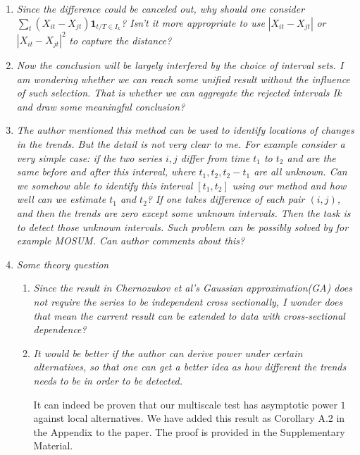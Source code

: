 \documentclass[a4paper,12pt]{article}
\begin{document}
\begin{enumerate}[label=(\arabic*),leftmargin=0.7cm]

\item \textit{Since the difference could be canceled out, why should one consider} $\sum\nolimits_t (X_{it} - X_{jt})\mathbf{1}_{t/T \in I_k}$\textit{? Isn't it more appropriate to use} $|X_{it} - X_{jt}|$ \textit{ or } $|X_{it} - X_{jt}|^2$ \textit{to capture the distance?}


\item \textit{Now the conclusion will be largely interfered by the choice of interval sets. I am wondering whether we can reach some unified result without the influence of such selection. That is whether we can aggregate the rejected intervals Ik and draw some meaningful conclusion?}

\item \textit{The author mentioned this method can be used to identify locations of changes in the trends. But the detail is not very clear to me. For example consider a very simple case: if the two series $i, j$ differ from time $t_1$ to $t_2$ and are the same before and after this interval, where $t_1, t_2, t_2 - t_1$ are all unknown. Can we somehow able to identify this interval $[t_1, t_2]$ using our method and how well can we estimate $t_1$ and $t_2$? If one takes difference of each pair $(i, j)$, and then the trends are zero except some unknown intervals. Then the task is to detect those unknown intervals. Such problem can be possibly solved by for example MOSUM. Can author comments about this?}

\item \textit{Some theory question}

\begin{enumerate}[label=(\roman*)]
\item \textit{Since the result in Chernozukov et al's Gaussian approximation(GA) does not require the series to be independent cross sectionally, I wonder does that mean the current result can be extended to data with cross-sectional dependence?}
\item \textit{It would be better if the author can derive power under certain alternatives, so that one can get a better idea as how different the trends needs to be in order to be detected.}

It can indeed be proven that our multiscale test has asymptotic power $1$ against local alternatives. We have added this result as Corollary A.2 in the Appendix to the paper. The proof is provided in the Supplementary Material.


\end{enumerate}
\end{enumerate}
\end{document}
